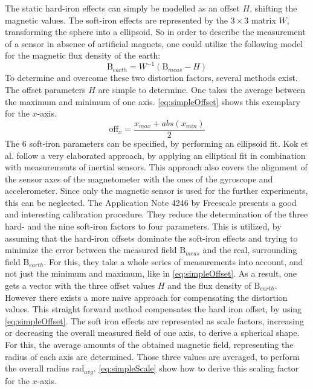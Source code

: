The static hard-iron effects can simply be modelled as an offset $ H $, shifting the magnetic values. The soft-iron effects are represented by the $ 3\times3 $ matrix $ W $, transforming the sphere into a ellipsoid. So in order to describe the measurement of a sensor in absence of artificial magnets, one could utilize the following model for the magnetic flux density of the earth:
\begin{equation} \label{eq:hardSoftModel}
\mathrm{B}_{earth} = W^{-1} (\mathrm{B}_{meas} - H)
\end{equation}
To determine and overcome these two distortion factors, several methods exist. The offset parameters $ H $ are simple to determine. One takes the average between the maximum and minimum of one axis. \ref{eq:simpleOffset} shows this exemplary for the $ x $-axis.
\begin{equation} \label{eq:simpleOffset}
\mathrm{off}_{x} = \frac{x_{max} + abs(x_{min})}{2}
\end{equation}
The 6 soft-iron parameters can be specified, by performing an ellipsoid fit. Kok et al. follow a very elaborated approach, by applying an elliptical fit in combination with measurements of inertial sensors. This approach also covers the alignment of the sensor axes of the magnetometer with the ones of the gyroscope and accelerometer. Since only the magnetic sensor is used for the further experiments, this can be neglected. The Application Note 4246 by Freescale \cite{ozyagcilar2012calibrating} presents a good and interesting calibration procedure. They reduce the determination of the three hard- and the nine soft-iron factors to four parameters. This is utilized, by assuming that the hard-iron offsets dominate the soft-iron effects and trying to minimize the error between the measured field $ \mathrm{B}_{meas} $ and the real, surrounding field $ \mathrm{B}_{earth} $. For this, they take a whole series of measurements into account, and not just the minimum and maximum, like in \ref{eq:simpleOffset}. As a result, one gets a vector with the three offset values $ H $ and the flux density of $ \mathrm{B}_{earth} $. However there exists a more naive approach for compensating the distortion values. This straight forward method compensates the hard iron offset, by using \ref{eq:simpleOffset}. The soft iron effects are represented as scale factors, increasing or decreasing the overall measured field of one axis, to derive a spherical shape. For this, the average amounts of the obtained magnetic field, representing the \grqq radius \grqq of each axis are determined. Those three values are averaged, to perform the overall radius $ \mathrm{rad}_{avg} $. \ref{eq:simpleScale} show how to derive this scaling factor for the $ x $-axis.
